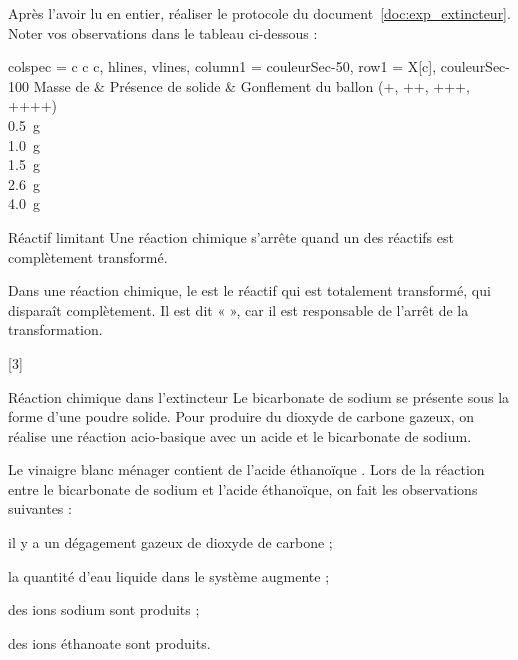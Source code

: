 \mesure Après l'avoir lu en entier, réaliser le protocole du document~\ref{doc:exp_extincteur}.
Noter vos observations dans le tableau ci-dessous :
\begin{center}
  \begin{tblr}{
    colspec = {c c c}, hlines, vlines,
    column{1} = {couleurSec-50},
    row{1} = {X[c], couleurSec-100}
  }
    Masse de \bicarbonateDeSodium & Présence de \bicarbonateDeSodium solide & Gonflement du ballon (+, ++, +++, ++++) \\
    \qty{0,5}{\g} \\
    \qty{1,0}{\g} \\
    \qty{1,5}{\g} \\
    \qty{2,6}{\g} \\
    \qty{4,0}{\g} \\
  \end{tblr}
\end{center}


\begin{doc}{Réactif limitant}
  Une réaction chimique s'arrête quand un des réactifs est complètement transformé.
  \begin{importants}
    Dans une réaction chimique, le  est le réactif qui est totalement transformé, qui disparaît complètement.
    Il est dit «  », car il est responsable de l'arrêt de la transformation.
  \end{importants}
\end{doc}

[3]



\begin{doc}{Réaction chimique dans l'extincteur}
  Le bicarbonate de sodium \bicarbonateDeSodium se présente sous la forme d'une poudre solide.
  Pour produire du dioxyde de carbone gazeux, on réalise une réaction acio-basique avec un acide et le bicarbonate de sodium.
  
  Le vinaigre blanc ménager contient de l'acide éthanoïque .
  Lors de la réaction entre le bicarbonate de sodium et l'acide éthanoïque, on fait les observations suivantes :
  \begin{listePoints}
    \item il y a un dégagement gazeux de dioxyde de carbone \dioxydeDeCarbone ;
    \item la quantité d'eau liquide dans le système augmente ;
    \item des ions sodium  sont produits ;
    \item des ions éthanoate  sont produits.
  \end{listePoints}
\end{doc}

